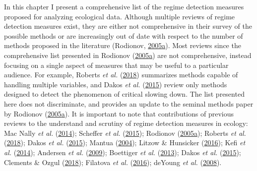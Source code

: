 \documentclass[print]{nuthesis}
\begin{document}
In this chapter I present a comprehensive list of the regime detection measures proposed for analyzing ecological data. Although multiple reviews of regime detection measures exist, they are either not comprehensive in their survey of the possible methods or are increasingly out of date with respect to the number of methods proposed in the literature (Rodionov, \protect\hyperlink{ref-rodionov_brief_2005}{2005}\protect\hyperlink{ref-rodionov_brief_2005}{a}). Most reviews since the comprehensive list presented in Rodionov (\protect\hyperlink{ref-rodionov_brief_2005}{2005}\protect\hyperlink{ref-rodionov_brief_2005}{a}) are not comprehensive, instead focusing on a single aspect of measures that may be useful to a particular audience. For example, Roberts \emph{et al.} (\protect\hyperlink{ref-roberts2018early}{2018}) summarizes methods capable of handling multiple variables, and Dakos \emph{et al.} (\protect\hyperlink{ref-dakos2015resilience}{2015}) review only methods designed to detect the phenomenon of critical slowing down. The list presented here does not discriminate, and provides an update to the seminal methods paper by Rodionov (\protect\hyperlink{ref-rodionov_brief_2005}{2005}\protect\hyperlink{ref-rodionov_brief_2005}{a}). It is important to note that contributions of previous reviews to the understand and scrutiny of regime detection measures in ecology: Mac Nally \emph{et al.} (\protect\hyperlink{ref-mac2014scrutiny}{2014}); Scheffer \emph{et al.} (\protect\hyperlink{ref-scheffer2015generic}{2015}); Rodionov (\protect\hyperlink{ref-rodionov_brief_2005}{2005}\protect\hyperlink{ref-rodionov_brief_2005}{a}); Roberts \emph{et al.} (\protect\hyperlink{ref-roberts2018early}{2018}); Dakos \emph{et al.} (\protect\hyperlink{ref-dakos2015resilience}{2015}); Mantua (\protect\hyperlink{ref-mantua_methods_2004}{2004}); Litzow \& Hunsicker (\protect\hyperlink{ref-litzow_early_2016}{2016}); Kefi \emph{et al.} (\protect\hyperlink{ref-kefi2014early}{2014}); Andersen \emph{et al.} (\protect\hyperlink{ref-andersen_ecological_2009}{2009}); Boettiger \emph{et al.} (\protect\hyperlink{ref-boettiger_early_2013}{2013}); Dakos \emph{et al.} (\protect\hyperlink{ref-dakos2015resilience}{2015}); Clements \& Ozgul (\protect\hyperlink{ref-clements2018indicators}{2018}); Filatova \emph{et al.} (\protect\hyperlink{ref-filatova2016regime}{2016}); deYoung \emph{et al.} (\protect\hyperlink{ref-deyoung_regime_2008}{2008}).
\end{document}
